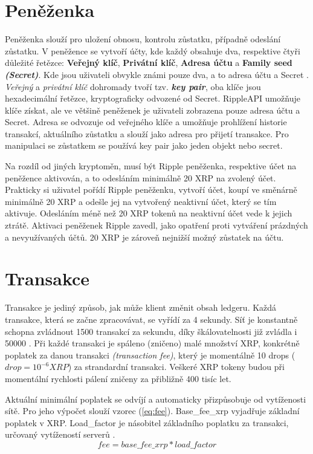 \documentclass[hidelinks, titlepage]{article}
\begin{document}
\section{Peněženka}
Peněženka slouží pro uložení obnosu, kontrolu zůstatku, případně odeslání zůstatku. V peněžence se vytvoří účty, kde každý obsahuje dva, respektive čtyři důležité řetězce: \textbf{Veřejný klíč}, \textbf{Privátní klíč}, \textbf{Adresa účtu} a \textbf{Family seed \textit{(Secret)}}. Kde jsou uživateli obvykle známi pouze dva, a to adresa účtu a Secret \cite{secret}. \textit{Veřejný} a \textit{privátní klíč} dohromady tvoří tzv. \textit{\textbf{key pair}}, oba klíče jsou hexadecimální řetězce, kryptograficky odvozené od Secret. RippleAPI umožňuje klíče získat, ale ve většině peněženek je uživateli zobrazena pouze adresa účtu a Secret. Adresa se odvozuje od veřejného klíče a umožňuje prohlížení historie transakcí, aktuálního zůstatku a slouží jako adresa pro přijetí transakce. Pro manipulaci se zůstatkem se používá key pair jako jeden objekt nebo secret.

Na rozdíl od jiných kryptoměn, musí být Ripple peněženka, respektive účet na peněžence aktivován, a to odesláním minimálně 20 XRP na zvolený účet. Prakticky si uživatel pořídí Ripple peněženku, vytvoří účet, koupí ve směnárně minimálně 20 XRP a odešle jej na vytvořený neaktivní účet, který se tím aktivuje. Odesláním méně než 20 XRP tokenů na neaktivní účet vede k jejich ztrátě. Aktivaci peněženek Ripple zavedl, jako opatření proti vytváření prázdných a nevyužívaných účtů. 20 XRP je zároveň nejnižší možný zůstatek na účtu.

\section{Transakce}
Transakce je jediný způsob, jak může klient změnit obsah ledgeru. Každá transakce, která se začne zpracovávat, se vyřídí za 4 sekundy. Síť je konstantně schopna zvládnout 1500 transakcí za sekundu, díky škálovatelnosti již zvládla i 50000 \cite{trans_num}. Při každé transakci je spáleno (zničeno) malé množství XRP, konkrétně poplatek za danou transakci \textit{(transaction fee)}, který je momentálně 10 drops ($drop = 10^{-6} XRP$) za strandardní transakci\cite{fee}. Veškeré XRP tokeny budou při momentální rychlosti pálení zničeny za přibližně 400 tisíc let\cite{burn_rate}.

Aktuální minimální poplatek se odvíjí a automaticky přizpůsobuje od vytíženosti sítě. Pro jeho výpočet slouží vzorec (\ref{eq:fee}). Base\_fee\_xrp vyjadřuje základní poplatek v XRP. Load\_factor je násobitel základního poplatku za transakci, určovaný vytížeností serverů \cite{serverinfo}.
\begin{equation}	\label{eq:fee}
fee = base\_fee\_xrp * load\_factor
\end{equation}
\end{document}
